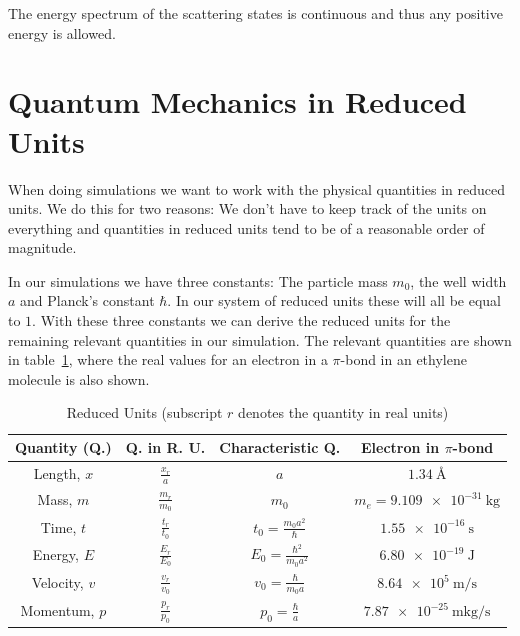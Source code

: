 \documentclass[12pt,a4paper]{article}
\begin{document}
The energy spectrum of the scattering states is continuous and thus any positive energy is allowed.

\section{Quantum Mechanics in Reduced Units}
When doing simulations we want to work with the physical quantities in reduced units. We do this for two reasons: We don't have to keep track of the units on everything and quantities in reduced units tend to be of a reasonable order of magnitude.

In our simulations we have three constants: The particle mass $m_0$, the well width $a$ and Planck's constant $\hbar$. In our system of reduced units these will all be equal to $1$. With these three constants we can derive the reduced units for the remaining relevant quantities in our simulation. The relevant quantities are shown in table~\ref{tab:reducedUnits}, where the real values for an electron in a $\pi$-bond in an ethylene molecule is also shown.

\begin{table}
\caption{Reduced Units (subscript $r$ denotes the quantity in real units)}
\label{tab:reducedUnits}
\begin{tabular}{c|ccc}
Quantity (Q.) & Q. in R. U. & Characteristic Q. & Electron in $\pi$-bond \\ 
\hline 
Length, $x$ & $\frac{x_r}{a}$ & $a$ & $\SI{1,34}{\angstrom}$ \\ 
Mass, $m$ & $\frac{m_r}{m_0}$ & $m_0$ & $m_e = \SI{9,109e-31}{\kilo\gram}$ \\ 
Time, $t$ & $\frac{t_r}{t_0}$ & $t_0 = \frac{m_0 a^2}{\hbar}$ & $\SI{1,55e-16}{\second}$ \\ 
Energy, $E$ & $\frac{E_r}{E_0}$ & $E_0 = \frac{\hbar^2}{m_0 a^2}$ & $\SI{6,80e-19}{\joule}$ \\ 
Velocity, $v$ & $\frac{v_r}{v_0}$ & $v_0 = \frac{\hbar}{m_0 a}$ & $\SI{8,64e5}{\meter\per\second}$ \\ 
Momentum, $p$ & $\frac{p_r}{p_0}$ & $p_0 = \frac{\hbar}{a}$ & $\SI{7,87e-25}{\meter\kilogram\per\second}$ \\ 
\end{tabular} 
\end{table}
\end{document}
